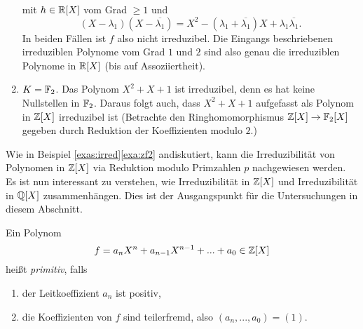 \documentclass{book}
\begin{document}
\begin{exas}
\begin{enumerate}
            mit $h \in \mathbb{R}[X]$ vom Grad $\ge 1$ und 
            \[
                (X- \lambda_1) (X - \overline{\lambda_1}) = X^2 - (\lambda_1 + \overline{\lambda_1}) X + \lambda_1 \overline{\lambda_1}.
            \]
            In beiden Fällen ist $f$ also nicht irreduzibel. Die Eingangs
            beschriebenen irreduziblen Polynome vom Grad $1$ und $2$ sind also
            genau die irreduziblen Polynome in $\mathbb{R}[X]$ (bis auf
            Assoziiertheit).
        \item\label{exa:zf2} $K = \mathbb{F}_2$. Das Polynom $X^2 + X + 1$ ist irreduzibel, denn es
            hat keine Nullstellen in $\mathbb{F}_2$. Daraus folgt auch, dass $X^2 + X
            + 1$ aufgefasst als Polynom in $\mathbb{Z}[X]$ irreduzibel ist (Betrachte
            den Ringhomomorphismus $\mathbb{Z}[X] \to \mathbb{F}_2[X]$ gegeben durch
            Reduktion der Koeffizienten modulo $2$.)
    \end{enumerate}
\end{exas}

Wie in Beispiel \ref{exas:irred}\ref{exa:zf2} andiskutiert, kann die
Irreduzibilität von Polynomen in $\mathbb{Z}[X]$ via Reduktion modulo
Primzahlen $p$ nachgewiesen werden. Es ist nun interessant zu verstehen, wie
Irreduzibilität in $\mathbb{Z}[X]$ und Irreduzibilität in $\mathbb{Q}[X]$ zusammenhängen.
Dies ist der Ausgangspunkt für die Untersuchungen in diesem Abschnitt. 

\begin{defi}
    \label{defi:primitiv}
    Ein Polynom
    \[
        f = a_n X^n + a_{n-1} X^{n-1} + ... + a_0 \in \mathbb{Z}[X]
    \]
    heißt \emph{primitiv}, falls
    \begin{enumerate}[label=\arabic * .]
        \item der Leitkoeffizient $a_n$ ist positiv,
        \item die Koeffizienten von $f$ sind teilerfremd, also $(a_n,...,a_0) = (1)$.
    \end{enumerate}
\end{defi}
\end{document}
